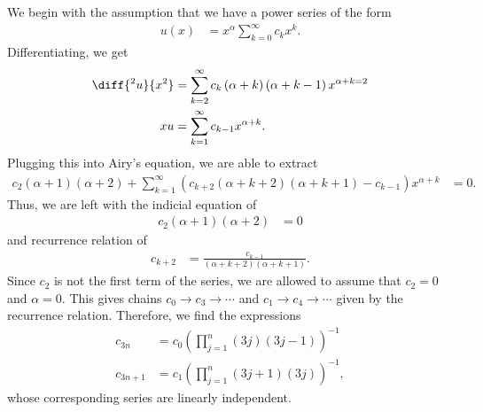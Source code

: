 \documentclass[10pt]{mypackage}
\begin{document}
\begin{solution}[39.28]
  We begin with the assumption that we have a power series of the form
  \begin{align*}
    u(x) &= x^{\alpha}\sum_{k=0}^{\infty}c_kx^{k}.
  \end{align*}
  Differentiating, we get
  \begin{align*}
    \diff{^2u}{x^2} &= \sum_{k=2}^{\infty}c_k\left( \alpha + k \right)\left( \alpha + k - 1 \right)x^{\alpha + k = 2}\\
    xu &= \sum_{k=1}^{\infty}c_{k-1}x^{\alpha + k}.
  \end{align*}
  Plugging this into Airy's equation, we are able to extract 
  \begin{align*}
    c_2\left( \alpha + 1 \right)\left( \alpha + 2 \right) + \sum_{k=1}^{\infty}\left( c_{k+2}\left( \alpha + k + 2 \right)\left( \alpha + k + 1 \right) - c_{k-1} \right)x^{\alpha + k} &= 0.
  \end{align*}
  Thus, we are left with the indicial equation of
  \begin{align*}
    c_2\left( \alpha + 1 \right)\left( \alpha + 2 \right) &= 0
  \end{align*}
  and recurrence relation of
  \begin{align*}
    c_{k+2} &= \frac{c_{k-1}}{\left( \alpha + k + 2 \right)\left( \alpha + k + 1 \right)}.
  \end{align*}
  Since $c_2$ is not the first term of the series, we are allowed to assume that $c_2 = 0$ and $\alpha = 0$. This gives chains $c_0 \to c_3\to \cdots$ and $c_1\to c_4\to \cdots$ given by the recurrence relation. Therefore, we find the expressions
  \begin{align*}
    c_{3n} &= c_0 \left( \prod_{j=1}^{n}\left( 3j \right)\left( 3j-1 \right) \right)^{-1}\\
    c_{3n + 1} &= c_1\left( \prod_{j=1}^{n}\left( 3j + 1 \right)\left( 3j \right) \right)^{-1},
  \end{align*}
  whose corresponding series are linearly independent.
\end{solution}
\end{document}
